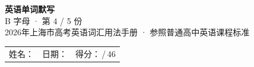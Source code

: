 \documentclass[10pt,a4paper]{article}
\begin{document}
\pagestyle{plain}

\begin{center}
{\LARGE\bfseries 英语单词默写}\\[0.22em]
{\large B 字母 · 第 4 / 5 份}\\[0.18em]
{\small 2026年上海市高考英语词汇用法手册 · 参照普通高中英语课程标准}
\end{center}

\vspace{0.25em}
\noindent\begin{tabular}{@{}p{}@{}p{}@{}p{}@{}}
姓名：\underline{\hspace{2.0cm}} & 日期：\underline{\hspace{2.0cm}} & 得分：\underline{\hspace{1.3cm}}\,/\,46 \\
\end{tabular}

\vspace{0.3em}

\vspace{0.08em}
\end{document}
